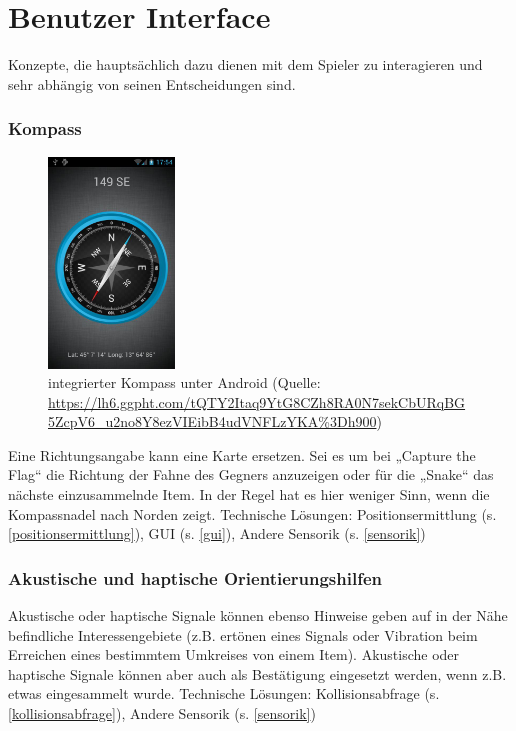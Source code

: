 \section{Benutzer Interface}



Konzepte, die hauptsächlich dazu dienen mit dem Spieler zu interagieren und sehr abhängig von seinen Entscheidungen sind.


\subsubsection{Kompass}
\begin{figure}
  \begin{center}
    \includegraphics[width=0.3\textwidth]{3-Spielkonzepte/3-2-Benutzer_Interface/kompass.png}
     \caption{integrierter Kompass unter Android
	(Quelle: \url{https://lh6.ggpht.com/tQTY2Itaq9YtG8CZh8RA0N7sekCbURqBG5ZcpV6_u2no8Y8ezVIEibB4udVNFLzYKA\%3Dh900})
		}
  \end{center}
\end{figure}

Eine Richtungsangabe kann eine Karte ersetzen. Sei es um bei „Capture the Flag“ die
Richtung der Fahne des Gegners anzuzeigen oder für die „Snake“ das nächste
einzusammelnde Item. In der Regel hat es hier weniger Sinn, wenn die Kompassnadel nach
Norden zeigt.
\newline
Technische Lösungen:
Positionsermittlung (s. \ref{positionsermittlung}), GUI (s. \ref{gui}), Andere Sensorik (s. \ref{sensorik})

\subsubsection{Akustische und haptische Orientierungshilfen}

Akustische oder haptische Signale können ebenso Hinweise geben auf in der Nähe
befindliche Interessengebiete (z.B. ertönen eines Signals oder Vibration beim Erreichen eines
bestimmtem Umkreises von einem Item). 
Akustische oder haptische Signale können aber auch als Bestätigung eingesetzt
werden, wenn z.B. etwas eingesammelt wurde.
\newline
Technische Lösungen:
Kollisionsabfrage (s. \ref{kollisionsabfrage}), Andere Sensorik (s. \ref{sensorik})


